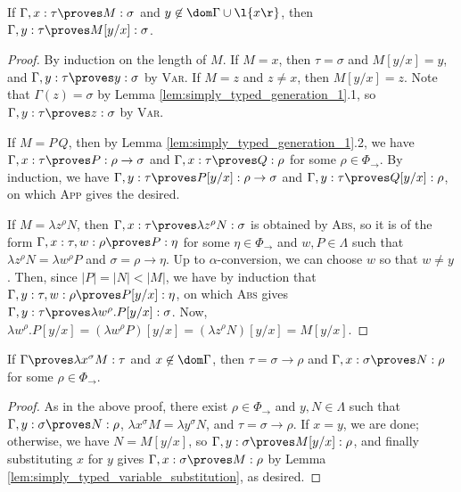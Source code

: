 \documentclass[reqno]{amsart}
\begin{document}
    \begin{lemma}\label{lem:simply_typed_variable_substitution}
        If $\Gamma,x:\tau\proves M:\sigma$ and $y\not\in\dom\Gamma\cup\l\{x\r\}$, then $\Gamma,y:\tau\proves M[y/x]:\sigma$.
    \end{lemma}
    \begin{proof}
        By induction on the length of $M$. If $M=x$, then $\tau=\sigma$ and $M[y/x]=y$, and $\Gamma,y:\tau\proves y:\sigma$ by \textsc{Var}. If $M=z$ and $z\neq x$, then $M[y/x]=z$. Note that $\Gamma(z)=\sigma$ by Lemma \ref{lem:simply_typed_generation_1}.1, so $\Gamma,y:\tau\proves z:\sigma$ by \textsc{Var}.

        If $M=P\,Q$, then by Lemma \ref{lem:simply_typed_generation_1}.2, we have $\Gamma,x:\tau\proves P:\rho\rightarrow\sigma$ and $\Gamma,x:\tau\proves Q:\rho$ for some $\rho\in\Phi_\rightarrow$. By induction, we have $\Gamma,y:\tau\proves P[y/x]:\rho\rightarrow\sigma$ and $\Gamma,y:\tau\proves Q[y/x]:\rho$, on which \textsc{App} gives the desired.

        If $M=\lambda z^\rho N$, then $\Gamma,x:\tau\proves\lambda z^\rho N:\sigma$ is obtained by \textsc{Abs}, so it is of the form $\Gamma,x:\tau,w:\rho\proves P:\eta$ for some $\eta\in\Phi_\rightarrow$ and $w,P\in\Lambda$ such that $\lambda z^\rho N=\lambda w^\rho P$ and $\sigma=\rho\to\eta$. Up to $\alpha$-conversion, we can choose $w$ so that $w\neq y$. Then, since $|P|=|N|<|M|$, we have by induction that $\Gamma,y:\tau,w:\rho\proves P[y/x]:\eta$, on which \textsc{Abs} gives $\Gamma,y:\tau\proves\lambda w^\rho.P[y/x]:\sigma$. Now, $\lambda w^\rho.P[y/x]=(\lambda w^\rho P)[y/x]=(\lambda z^\rho N)[y/x]=M[y/x]$.
    \end{proof}

    \begin{lemma}\label{lem:simply_typed_generation_2}
        If $\Gamma\proves\lambda x^\sigma M:\tau$ and $x\not\in\dom\Gamma$, then $\tau=\sigma\rightarrow\rho$ and $\Gamma,x:\sigma\proves N:\rho$ for some $\rho\in\Phi_\rightarrow$.
    \end{lemma}
    \begin{proof}
        As in the above proof, there exist $\rho\in\Phi_\rightarrow$ and $y,N\in\Lambda$ such that $\Gamma,y:\sigma\proves N:\rho$, $\lambda x^\sigma M=\lambda y^\sigma N$, and $\tau=\sigma\rightarrow\rho$. If $x=y$, we are done; otherwise, we have $N=M[y/x]$, so $\Gamma,y:\sigma\proves M[y/x]:\rho$, and finally substituting $x$ for $y$ gives $\Gamma,x:\sigma\proves M:\rho$ by Lemma \ref{lem:simply_typed_variable_substitution}, as desired.
    \end{proof}
\end{document}
